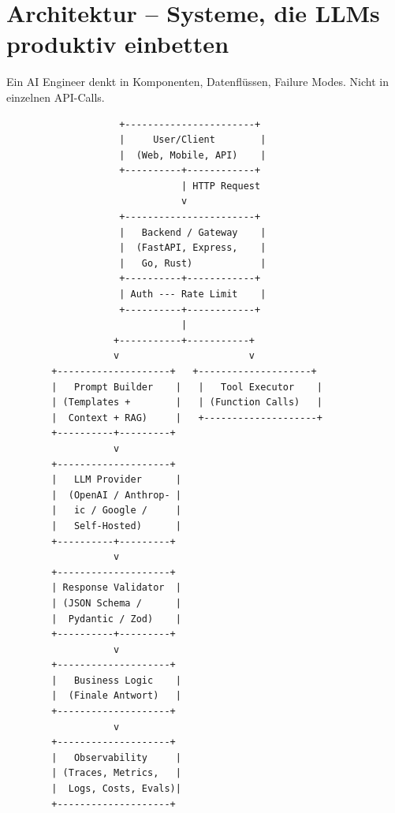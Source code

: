 
\section{Architektur -- Systeme, die LLMs produktiv einbetten}

Ein AI Engineer denkt in Komponenten, Datenflüssen, Failure Modes. Nicht in einzelnen API-Calls.

\begin{verbatim}
                    +-----------------------+
                    |     User/Client        |
                    |  (Web, Mobile, API)    |
                    +----------+------------+
                               | HTTP Request
                               v
                    +-----------------------+
                    |   Backend / Gateway    |
                    |  (FastAPI, Express,    |
                    |   Go, Rust)            |
                    +----------+------------+
                    | Auth --- Rate Limit    |
                    +----------+------------+
                               |
                   +-----------+-----------+
                   v                       v
        +--------------------+   +--------------------+
        |   Prompt Builder    |   |   Tool Executor    |
        | (Templates +        |   | (Function Calls)   |
        |  Context + RAG)     |   +--------------------+
        +----------+---------+
                   v
        +--------------------+
        |   LLM Provider      |
        |  (OpenAI / Anthrop- |
        |   ic / Google /     |
        |   Self-Hosted)      |
        +----------+---------+
                   v
        +--------------------+
        | Response Validator  |
        | (JSON Schema /      |
        |  Pydantic / Zod)    |
        +----------+---------+
                   v
        +--------------------+
        |   Business Logic    |
        |  (Finale Antwort)   |
        +--------------------+
                   v
        +--------------------+
        |   Observability     |
        | (Traces, Metrics,   |
        |  Logs, Costs, Evals)|
        +--------------------+
\end{verbatim}

